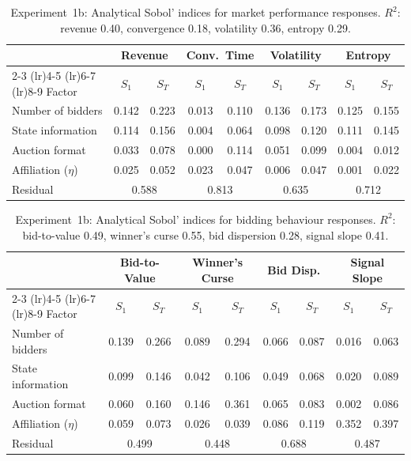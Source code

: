 \begin{table}[H]
\centering
\caption{Experiment~1b: Analytical Sobol' indices for market performance responses. $R^2$: revenue 0.40, convergence 0.18, volatility 0.36, entropy 0.29.}
\label{tab:sens_exp1b_a}
\small
\begin{tabular}{l cc cc cc cc}
\toprule
& \multicolumn{2}{c}{Revenue} & \multicolumn{2}{c}{Conv.\ Time} & \multicolumn{2}{c}{Volatility} & \multicolumn{2}{c}{Entropy} \\
\cmidrule(lr){2-3} \cmidrule(lr){4-5} \cmidrule(lr){6-7} \cmidrule(lr){8-9}
Factor & $S_1$ & $S_T$ & $S_1$ & $S_T$ & $S_1$ & $S_T$ & $S_1$ & $S_T$ \\
\midrule
Number of bidders     & 0.142 & 0.223 & 0.013 & 0.110 & 0.136 & 0.173 & 0.125 & 0.155 \\
State information     & 0.114 & 0.156 & 0.004 & 0.064 & 0.098 & 0.120 & 0.111 & 0.145 \\
Auction format        & 0.033 & 0.078 & 0.000 & 0.114 & 0.051 & 0.099 & 0.004 & 0.012 \\
Affiliation ($\eta$)  & 0.025 & 0.052 & 0.023 & 0.047 & 0.006 & 0.047 & 0.001 & 0.022 \\
\midrule
Residual              & \multicolumn{2}{c}{0.588} & \multicolumn{2}{c}{0.813} & \multicolumn{2}{c}{0.635} & \multicolumn{2}{c}{0.712} \\
\bottomrule
\end{tabular}
\end{table}

\begin{table}[H]
\centering
\caption{Experiment~1b: Analytical Sobol' indices for bidding behaviour responses. $R^2$: bid-to-value 0.49, winner's curse 0.55, bid dispersion 0.28, signal slope 0.41.}
\label{tab:sens_exp1b_b}
\small
\begin{tabular}{l cc cc cc cc}
\toprule
& \multicolumn{2}{c}{Bid-to-Value} & \multicolumn{2}{c}{Winner's Curse} & \multicolumn{2}{c}{Bid Disp.} & \multicolumn{2}{c}{Signal Slope} \\
\cmidrule(lr){2-3} \cmidrule(lr){4-5} \cmidrule(lr){6-7} \cmidrule(lr){8-9}
Factor & $S_1$ & $S_T$ & $S_1$ & $S_T$ & $S_1$ & $S_T$ & $S_1$ & $S_T$ \\
\midrule
Number of bidders     & 0.139 & 0.266 & 0.089 & 0.294 & 0.066 & 0.087 & 0.016 & 0.063 \\
State information     & 0.099 & 0.146 & 0.042 & 0.106 & 0.049 & 0.068 & 0.020 & 0.089 \\
Auction format        & 0.060 & 0.160 & 0.146 & 0.361 & 0.065 & 0.083 & 0.002 & 0.086 \\
Affiliation ($\eta$)  & 0.059 & 0.073 & 0.026 & 0.039 & 0.086 & 0.119 & 0.352 & 0.397 \\
\midrule
Residual              & \multicolumn{2}{c}{0.499} & \multicolumn{2}{c}{0.448} & \multicolumn{2}{c}{0.688} & \multicolumn{2}{c}{0.487} \\
\bottomrule
\end{tabular}
\end{table}

